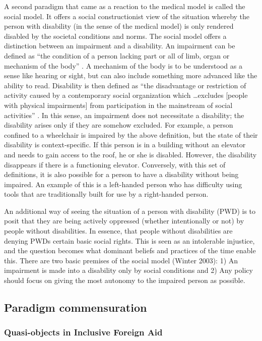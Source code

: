 \documentclass[a4paper]{article}
\begin{document}
A second paradigm that came as a reaction to the medical model is called the
social model. It offers a social constructionist view of the situation whereby
the person with disability (in the sense of the medical model) is only rendered
disabled by the societal conditions and norms. The social model offers a
distinction between an impairment and a disability. An impairment can be
defined as ``the condition of a person lacking part or all of limb, organ or
mechanism of the body'' \citep{winter2003development}. A mechanism of the body
is to be understood as a sense like hearing or sight, but can also include
something more advanced like the ability to read. Disability is then defined as
``the disadvantage or restriction of activity caused by a contemporary social
organization which \ldots excludes [people with physical impairments] from
participation in the mainstream of social activities''
\citep{winter2003development}. In this sense, an impairment does not
necessitate a disability; the disability arises only if they are somehow
excluded. For example, a person confined to a wheelchair is impaired by the
above definition, but the state of their disability is context-specific.  If
this person is in a building without an elevator and needs to gain access to
the roof, he or she is disabled. However, the disability disappears if there is
a functioning elevator. Conversely, with this set of definitions, it is also
possible for a person to have a disability without being impaired. An example
of this is a left-handed person who has difficulty using tools that are
traditionally built for use by a right-handed person.

An additional way of seeing the situation of a person with disability (PWD) is
to posit that they are being actively oppressed (whether intentionally or not)
by people without disabilities. In essence, that people without disabilities
are denying PWDs certain basic social rights. This is seen as an intolerable
injustice, and the question becomes what dominant beliefs and practices of the
time enable this. There are two basic premises of the social model (Winter
2003): 1) An impairment is made into a disability only by social conditions
and 2) Any policy should focus on giving the most autonomy to the impaired
person as possible.  

\subsection{Paradigm commensuration}

\subsubsection{Quasi-objects in Inclusive Foreign Aid}
\end{document}
